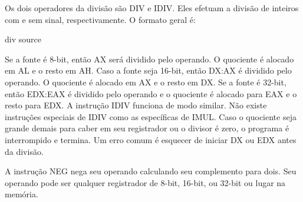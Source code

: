 Os dois operadores da divisão são {\code DIV} e {\code IDIV}. Eles efetuam a
divisão de inteiros com e sem sinal, respectivamente. O formato geral é:
\begin{AsmCodeListing}[numbers=none,frame=none]
      div   source
\end{AsmCodeListing}
Se a fonte é 8-bit, então AX será dividido pelo operando. O
quociente é alocado em AL e o resto em AH. Caso a fonte seja 
16-bit, então DX:AX é dividido pelo operando. O quociente é alocado
em AX e o resto em DX. Se a fonte é 32-bit, então
EDX:EAX é dividido pelo operando e o quociente é
alocado para EAX e o resto para EDX. A instrução {\code IDIV}
 funciona de modo similar. Não existe instruções especiais de
{\code IDIV} como as específicas de {\code IMUL}. Caso o quociente
seja grande demais para caber em seu registrador ou o divisor é zero,
o programa é interrompido e termina. Um erro comum é esquecer
de iniciar DX ou EDX antes da divisão.

A instrução {\code NEG}  nega seu operando calculando seu
complemento para dois. Seu operando pode ser qualquer registrador de 8-bit, 16-bit, ou 32-bit
ou lugar na memória.

